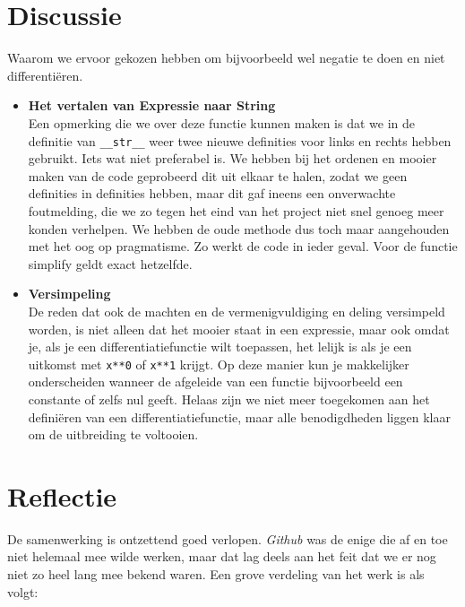 \documentclass[12pt]{article}
\begin{document}
\section{Discussie}
Waarom we ervoor gekozen hebben om bijvoorbeeld wel negatie te doen en niet differenti\"eren.
\begin{itemize}
\item \textbf{Het vertalen van Expressie naar String}\\
Een opmerking die we over deze functie kunnen maken is dat we in de definitie van \texttt{\_\_str\_\_} weer twee nieuwe definities voor links en rechts hebben gebruikt. Iets wat niet preferabel is. We hebben bij het ordenen en mooier maken van de code geprobeerd dit uit elkaar te halen, zodat we geen definities in definities hebben, maar dit gaf ineens een onverwachte foutmelding, die we zo tegen het eind van het project niet snel genoeg meer konden verhelpen. We hebben de oude methode dus toch maar aangehouden met het oog op pragmatisme. Zo werkt de code in ieder geval. Voor de functie simplify geldt exact hetzelfde.
\item \textbf{Versimpeling}\\
De reden dat ook de machten en de vermenigvuldiging en deling versimpeld worden, is niet alleen dat het mooier staat in een expressie, maar ook omdat je, als je een differentiatiefunctie wilt toepassen, het lelijk is als je een uitkomst met \texttt{x**0} of \texttt{x**1} krijgt. Op deze manier kun je makkelijker onderscheiden wanneer de afgeleide van een functie bijvoorbeeld een constante of zelfs nul geeft. Helaas zijn we niet meer toegekomen aan het defini\"eren van een differentiatiefunctie, maar alle benodigdheden liggen klaar om de uitbreiding te voltooien.

\end{itemize}


\section{Reflectie}
De samenwerking is ontzettend goed verlopen. \textit{Github} was de enige die af en toe niet helemaal mee wilde werken, maar dat lag deels aan het feit dat we er nog niet zo heel lang mee bekend waren. Een grove verdeling van het werk is als volgt:
\end{document}
